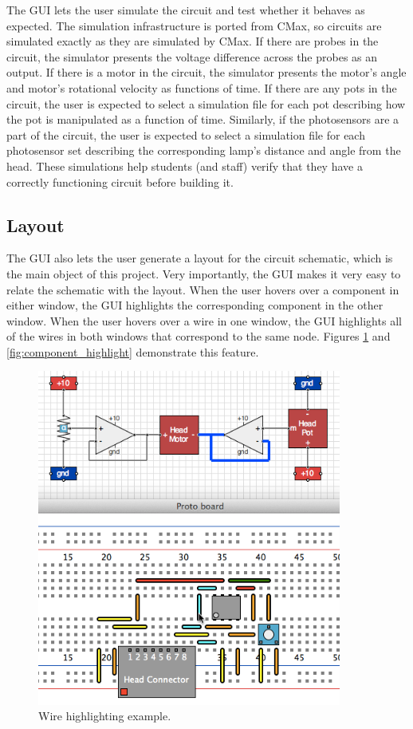 The GUI lets the user simulate the circuit and test whether it behaves as
expected. The simulation infrastructure is ported from CMax, so circuits
are simulated exactly as they are simulated by CMax. If there are probes in the
circuit, the simulator presents the voltage difference across the probes as an
output. If there is a motor in the circuit, the simulator presents the motor's
angle and motor's rotational velocity as functions of time. If there are any
pots in the circuit, the user is expected to select a simulation file for each
pot describing how the pot is manipulated as a function of time. Similarly,
if the photosensors are a part of the circuit, the user is expected to select
a simulation file for each photosensor set describing the corresponding lamp's
distance and
angle from the head. These simulations help students (and staff) verify that
they have a correctly functioning circuit before building it.

\subsection{Layout}

The GUI also lets the user generate a layout for the circuit schematic, which is
the main object of this project. Very importantly, the GUI makes it very easy to
relate the schematic with the layout. When the user hovers over a component in
either window, the GUI highlights the corresponding component in the other
window. When the user hovers over a wire in one window, the GUI highlights all
of the wires in both windows that correspond to the same node. Figures
\ref{fig:wire_highlight} and \ref{fig:component_highlight} demonstrate this
feature.

\begin{figure}
\begin{center}
\includegraphics[width=10cm]{Images/gui_wire_highlight.png}
\caption[GUI wire highlighting example]{Wire highlighting example.}
\label{fig:wire_highlight}
\end{center}
\end{figure}


